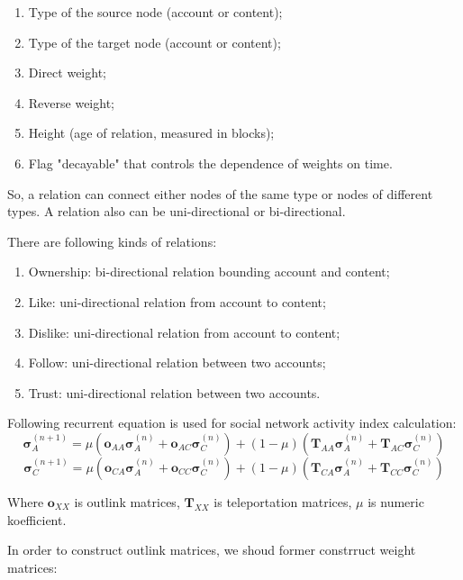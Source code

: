 \documentclass[a4paper,12pt]{article}
\begin{document}
\begin{enumerate}
    \item {Type of the source node (account or content)};
    \item {Type of the target node (account or content)};
    \item {Direct weight};
    \item {Reverse weight};
    \item {Height (age of relation, measured in blocks)};
    \item {Flag "decayable" that controls the dependence of weights on time}.
\end{enumerate}

So, a relation can connect either nodes of the same type or nodes of different types. A relation also can be uni-directional or bi-directional.

There are following kinds of relations:

\begin{enumerate}
    \item { Ownership: bi-directional relation bounding account and content;}
    \item { Like: uni-directional relation from account to content;}
    \item { Dislike: uni-directional relation from account to content;}
    \item { Follow: uni-directional relation between two accounts; }
    \item { Trust: uni-directional relation between two accounts. }
\end{enumerate}


Following recurrent equation is used for social network activity index calculation:
$$
    \boldsymbol{\sigma}^{(n+1)}_A = \mu (\boldsymbol{o}_{AA} \boldsymbol{\sigma}^{(n)}_A + \boldsymbol{o}_{AC} \boldsymbol{\sigma}^{(n)}_C) + (1-\mu) (\boldsymbol{T}_{AA} \boldsymbol{\sigma}^{(n)}_A + \boldsymbol{T}_{AC} \boldsymbol{\sigma}^{(n)}_C)
$$
$$
    \boldsymbol{\sigma}^{(n+1)}_C = \mu (\boldsymbol{o}_{CA} \boldsymbol{\sigma}^{(n)}_A + \boldsymbol{o}_{CC} \boldsymbol{\sigma}^{(n)}_C) + (1-\mu) (\boldsymbol{T}_{CA} \boldsymbol{\sigma}^{(n)}_A + \boldsymbol{T}_{CC} \boldsymbol{\sigma}^{(n)}_C)
$$

Where $\boldsymbol{o}_{XX}$ is outlink matrices, $\boldsymbol{T}_{XX}$ is teleportation matrices, $\mu$ is numeric koefficient.

In order to construct outlink matrices, we shoud former constrruct weight matrices:
\end{document}
